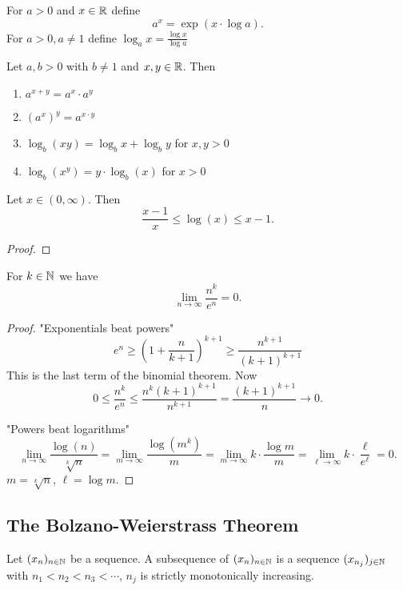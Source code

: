 \documentclass[10pt, a4paper]{article}
\newcommand{\seq}[1][x]{(#1_n)_{n \in \N}}
\begin{document}
For $a > 0$ and $x \in \mathbb{R}$ define
\[
a ^ x = \exp(x \cdot \log a).
\]
For $a > 0, a \neq 1$ define $\log_a x = \frac{\log x}{\log a}$

\begin{proposition}
    Let $a, b > 0$ with $b \neq 1$ and $x, y \in \mathbb{R}$.
    Then
    \begin{enumerate}[label = (\alph*)]
        \item $a ^ {x + y} = a ^ x \cdot a ^ y$
        \item $(a ^ x) ^ y = a ^ {x \cdot y}$
        \item $\log_b(xy) = \log_b x + \log_b y$ for $x, y > 0$
        \item $\log_b(x ^ y) = y \cdot \log_b(x)$ for $x > 0$
    \end{enumerate}
\end{proposition}

\begin{lemma}
    Let $x \in (0, \infty)$.
    Then 
    \[
    \frac{x - 1}{x} \leq \log(x) \leq x - 1.
    \]
    \begin{proof}
        
    \end{proof}
\end{lemma}

\begin{example}
    For $k \in \mathbb{N}$ we have
    \[
    \lim_{n \to \infty}\frac{n ^ k}{e ^ n} = 0.
    \]
    \begin{proof}
        "Exponentials beat powers"
        \[
        e ^ n \geq \left(1 + \frac{n}{k + 1}\right) ^ {k + 1} \geq \frac{n ^ {k + 1}}{(k + 1) ^ {k + 1}}
        \]
        This is the last term of the binomial theorem.
        Now
        \[
        0 \leq \frac{n ^ k}{e ^ n} \leq \frac{n ^ k(k + 1) ^ {k + 1}}{n ^ {k + 1}} = \frac{(k + 1) ^ {k + 1}}{n} \to 0.
        \]
        
        "Powers beat logarithms"
        \[
        \lim_{n \to \infty}\frac{\log(n)}{\sqrt[k]{n}} = \lim_{m \to \infty}\frac{\log(m ^ k)}{m} = \lim_{m \to \infty}k \cdot \frac{\log m}{m} = \lim_{\ell \to \infty}k \cdot \frac{\ell}{e ^ \ell} = 0.
        \]
        $m = \sqrt[k]{n}$,
        $\ell = \log m$.
    \end{proof}
\end{example}

\subsection{The Bolzano-Weierstrass Theorem}
\begin{definition}
    Let $\seq$ be a sequence.
    A subsequence of $\seq$ is a sequence $(x_{n_j})_{j \in \mathbb{N}}$ with
    $n_1 < n_2 < n_3 < \dotsi$,
    $n_j$ is strictly monotonically increasing.
\end{definition}
\end{document}
